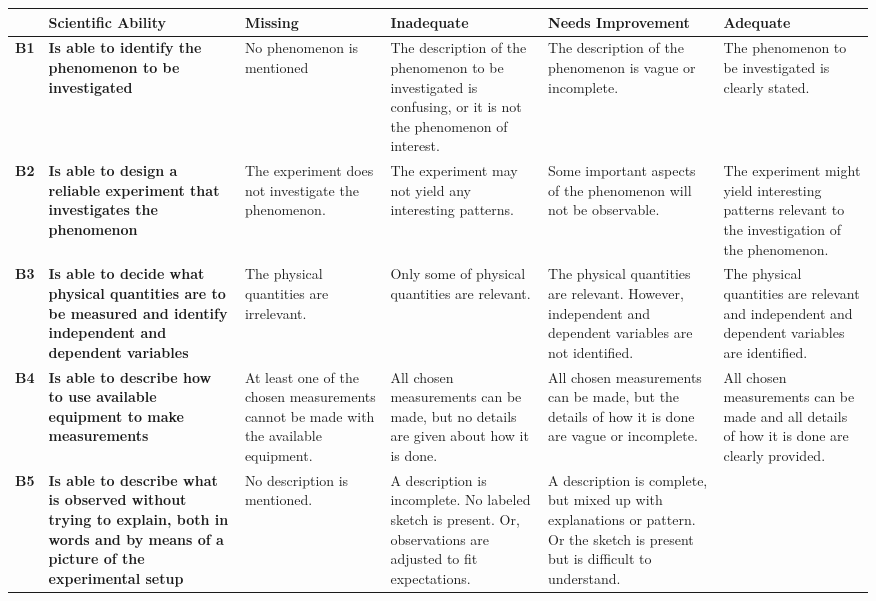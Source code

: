 \begin{landscape}
\begin{longtable}{>{\bfseries}p{0.02\textheight}|>{\bfseries\RaggedRight}p{0.25\textheight}|>{\RaggedRight}p{0.21\textheight}|>{\RaggedRight}p{0.21\textheight}|>{\RaggedRight}p{0.22\textheight}|>{\RaggedRight}p{0.22\textheight}}
		\toprule
		& Scientific Ability
		& Missing & Inadequate & Needs Improvement & Adequate \\ \midrule \endhead
		B1
		& Is able to identify the phenomenon to be investigated
		& No phenomenon is mentioned
		& The description of the phenomenon to be investigated is confusing, or it is not the phenomenon of interest.
		& \midsloppy The description of the phenomenon is vague or incomplete.
		& The phenomenon to be investigated is clearly stated. \\ \midrule
		B2
		& Is able to design a reliable experiment that investigates the phenomenon
		& The experiment does not investigate the phenomenon.
		& The experiment may not yield any interesting patterns.
		& Some important aspects of the phenomenon will not be observable.
		& The experiment might yield interesting patterns relevant to the investigation of the phenomenon. \\ \midrule
		B3
		& Is able to decide what physical quantities are to be measured and identify independent and dependent variables
		& The physical quantities are irrelevant.
		& Only some of physical quantities are relevant.
		& The physical quantities are relevant. However, independent and dependent variables are not identified.
		& The physical quantities are relevant and independent and dependent variables are identified. \\ \midrule
		B4
		& Is able to describe how to use available equipment to make measurements
		& At least one of the chosen measurements cannot be made with the available equipment.
		& All chosen measurements can be made, but no details are given about how it is done.
		& All chosen measurements can be made, but the details of how it is done are vague or incomplete.
		& All chosen measurements can be made and all details of how it is done are clearly provided. \\ \midrule
		B5
		& Is able to describe what is observed without trying to explain, both in words and by means of a picture of the experimental setup
		& No description is mentioned.
		& A description is incomplete. No labeled sketch is present. Or, observations are adjusted to fit expectations.
		& A description is complete, but mixed up with explanations or pattern. Or the sketch is present but is difficult to understand.

\end{longtable}
\end{landscape}

